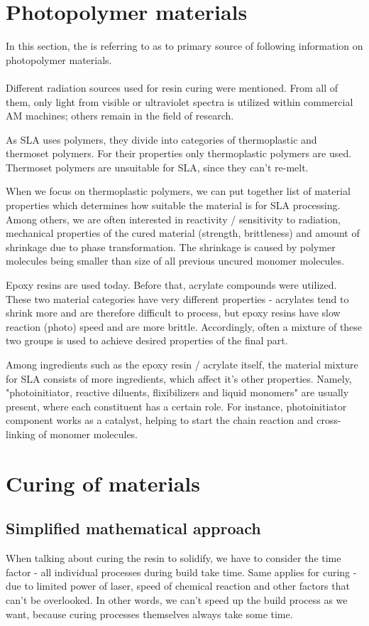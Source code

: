 \documentclass[a4paper, 11pt, reqno]{report}
\begin{document}
\section{Photopolymer materials}
In this section, the \cite{AMT} is referring to \cite{SLAmaterials} as to primary source of following information on photopolymer materials.\\
\\
Different radiation sources used for resin curing were mentioned. From all of them, only light from visible or ultraviolet spectra is utilized within commercial AM machines; others remain in the field of research.

	As SLA uses polymers, they divide into categories of thermoplastic and thermoset polymers. For their properties only thermoplastic polymers are used. Thermoset polymers are unsuitable for SLA, since they can't re-melt.
	
	When we focus on thermoplastic polymers, we can put together list of material properties which determines how suitable the material is for SLA processing. Among others, we are often interested in reactivity / sensitivity to radiation, mechanical properties of the cured material (strength, brittleness) and amount of shrinkage due to phase transformation. The shrinkage is caused  by polymer molecules being smaller than  size of all previous uncured monomer molecules.
	
	Epoxy resins are used today. Before that, acrylate compounds were utilized. These two material categories have very different properties - acrylates tend to shrink more and are therefore difficult to process, but epoxy resins have slow reaction (photo) speed and are more brittle. Accordingly, often a mixture of these two groups is used to achieve desired properties of the final part.
	
	Among ingredients such as the epoxy resin / acrylate itself, the material mixture for SLA consists of more ingredients, which affect it's other properties. Namely, "photoinitiator, reactive diluents, flixibilizers and liquid monomers" \cite[p. ~67]{AMT} are usually present, where each constituent has a certain role. For instance, photoinitiator component works as a catalyst, helping to start the chain reaction and cross-linking of monomer molecules.
%
%
%
\section{Curing of materials}
%
\subsection{Simplified mathematical approach}
When talking about curing the resin to solidify, we have to consider the time factor - all individual processes during build take time. Same applies for curing - due to limited power of laser, speed of chemical reaction and other factors that can't be overlooked. In other words, we can't speed up the build process as we want, because curing processes themselves always take some time.
\end{document}
